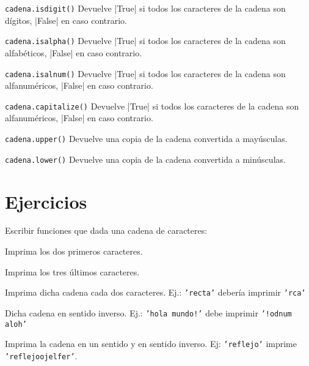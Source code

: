 \begin{referencia_python}
\begin{sintaxis}{\lstinline!cadena.isdigit()!}
Devuelve |True| si todos los caracteres de la cadena son dígitos, |False| en
caso contrario.
\end{sintaxis}

\begin{sintaxis}{\lstinline!cadena.isalpha()!}
Devuelve |True| si todos los caracteres de la cadena son alfabéticos, |False| en
caso contrario.
\end{sintaxis}

\begin{sintaxis}{\lstinline!cadena.isalnum()!}
Devuelve |True| si todos los caracteres de la cadena son alfanuméricos, |False| en
caso contrario.
\end{sintaxis}

\begin{sintaxis}{\lstinline!cadena.capitalize()!}
Devuelve |True| si todos los caracteres de la cadena son alfanuméricos, |False| en
caso contrario.
\end{sintaxis}

\begin{sintaxis}{\lstinline!cadena.upper()!}
Devuelve una copia de la cadena convertida a mayúsculas.
\end{sintaxis}

\begin{sintaxis}{\lstinline!cadena.lower()!}
Devuelve una copia de la cadena convertida a minúsculas.
\end{sintaxis}
\end{referencia_python}


\newpage
\section{Ejercicios}

\begin{ejercicio}
Escribir funciones que dada una cadena de caracteres:
\begin{partes}
\item Imprima los dos primeros caracteres.
\item Imprima los tres últimos caracteres.
\item Imprima dicha cadena cada dos caracteres. Ej.: \texttt{'recta'} debería
imprimir \texttt{'rca'}
\item Dicha cadena en sentido inverso. Ej.: \texttt{'hola mundo!'} debe
imprimir \texttt{'!odnum aloh'}
\item Imprima la cadena en un sentido y en sentido inverso. Ej:
\texttt{'reflejo'} imprime \texttt{'reflejoojelfer'}.
\end{partes}
\end{ejercicio}


